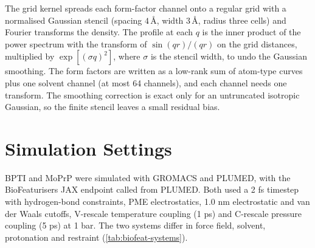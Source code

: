 The grid kernel spreads each form-factor channel onto a regular grid with a normalised Gaussian stencil (spacing $4\,\text{\AA}$, width $3\,\text{\AA}$, radius three cells) and Fourier transforms the density.\supercite{chamberlainFittingHighresolutionElectron2023} The profile at each $q$ is the inner product of the power spectrum with the transform of $\sin(qr)/(qr)$ on the grid distances, multiplied by $\exp[(\sigma q)^2]$, where $\sigma$ is the stencil width, to undo the Gaussian smoothing.\supercite{greengardAcceleratingNonuniformFast2004} The form factors are written as a low-rank sum of atom-type curves plus one solvent channel (at most 64 channels), and each channel needs one transform. The smoothing correction is exact only for an untruncated isotropic Gaussian, so the finite stencil leaves a small residual bias.

\section{Simulation Settings}
\label{app:biofeat-simulation}

BPTI and MoPrP were simulated with GROMACS\supercite{abrahamGROMACSHighPerformance2015} and PLUMED,\supercite{bonomiPromotingTransparencyReproducibility2019} with the BioFeaturisers JAX endpoint called from PLUMED. Both used a 2 fs timestep with hydrogen-bond constraints, PME electrostatics,\supercite{essmannSmoothParticleMesh1995} 1.0 nm electrostatic and van der Waals cutoffs, V-rescale temperature coupling (1 ps)\supercite{bussiCanonicalSamplingVelocity2007} and C-rescale pressure coupling (5 ps) at 1 bar. %
The two systems differ in force field, solvent, protonation and restraint (\cref{tab:biofeat-systems}).


